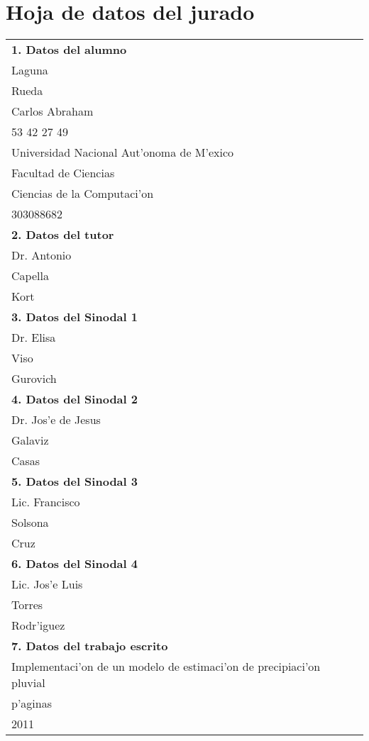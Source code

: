 
\section*{Hoja de datos del jurado}

\begin{center}
\begin{tabular}{|l|}

  \hline 
  \textbf{ 1. Datos del alumno}\\ Laguna \\Rueda\\Carlos Abraham\\53 42 27 49\\
  Universidad Nacional Aut'onoma de M'exico\\Facultad de Ciencias\\Ciencias de la Computaci'on\\
  303088682  \tabularnewline
  \hline
  \textbf{2. Datos del tutor}\\ Dr. Antonio\\Capella\\Kort\tabularnewline
  \hline    
  \textbf{3. Datos del Sinodal 1}\\ Dr. Elisa\\Viso\\Gurovich\tabularnewline
  \hline 

  \textbf{4. Datos del Sinodal 2}\\ Dr. Jos'e de Jesus\\Galaviz\\Casas\tabularnewline
  \hline 
  \textbf{5. Datos del Sinodal 3}\\Lic. Francisco\\Solsona\\Cruz \tabularnewline
  \hline 
  \textbf{6. Datos del Sinodal 4}\\ Lic. Jos'e Luis\\Torres\\Rodr'iguez\tabularnewline
  \hline
  \textbf{7. Datos del trabajo escrito}\\
  Implementaci'on de un modelo de estimaci'on de precipiaci'on pluvial \\
   \pageref{LastPage} p'aginas\\2011\tabularnewline
  \hline
\end{tabular}
\end{center}
